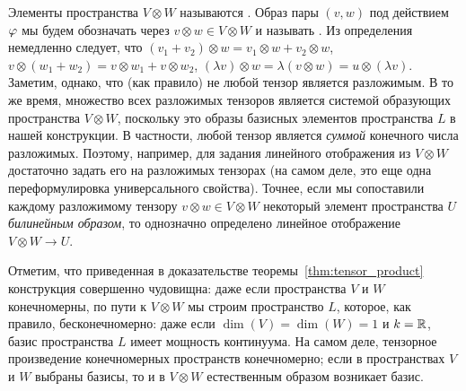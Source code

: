 Элементы пространства $V\otimes W$ называются
.
Образ пары $(v,w)$ под действием $\varphi$ мы будем обозначать через
$v\otimes w\in V\otimes W$ и называть
. Из определения
немедленно следует,
что $(v_1+v_2)\otimes w = v_1\otimes w + v_2\otimes w$,
$v\otimes(w_1+w_2) = v\otimes w_1 + v\otimes w_2$,
$(\lambda v)\otimes w = \lambda (v\otimes w) = u\otimes (\lambda v)$.
Заметим, однако, что (как правило) не любой тензор является
разложимым. В то же время, множество всех разложимых тензоров является
системой образующих пространства $V\otimes W$, поскольку это образы
базисных элементов пространства $L$ в нашей конструкции. В частности,
любой тензор является {\it суммой} конечного числа
разложимых. Поэтому, например, для задания линейного отображения из
$V\otimes W$ достаточно задать его на разложимых тензорах (на самом
деле, это еще одна переформулировка универсального свойства). Точнее,
если мы сопоставили каждому разложимому тензору $v\otimes w\in
V\otimes W$ некоторый элемент пространства $U$ {\em билинейным
  образом}, то однозначно определено линейное отображение $V\otimes
W\to U$.

Отметим, что приведенная в доказательстве
теоремы~\ref{thm:tensor_product} конструкция совершенно чудовищна:
даже если пространства $V$ и $W$ конечномерны, по пути к $V\otimes W$
мы строим пространство $L$, которое, как правило, бесконечномерно:
даже если $\dim(V)=\dim(W)=1$ и $k=\mathbb R$, базис пространства $L$
имеет мощность континуума. На самом деле, тензорное произведение
конечномерных пространств конечномерно; если в пространствах $V$ и $W$
выбраны базисы, то и в $V\otimes W$ естественным образом возникает
базис.

